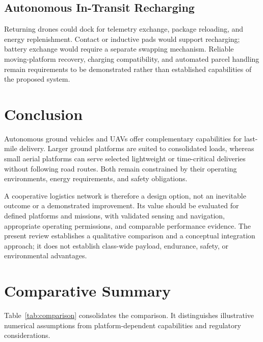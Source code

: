 \documentclass[11pt,a4paper]{article}
\begin{document}
\subsection{Autonomous In-Transit Recharging}
Returning drones could dock for telemetry exchange, package reloading, and energy replenishment. Contact or inductive pads would support recharging; battery exchange would require a separate swapping mechanism. Reliable moving-platform recovery, charging compatibility, and automated parcel handling remain requirements to be demonstrated rather than established capabilities of the proposed system.

\section{Conclusion}
Autonomous ground vehicles and UAVs offer complementary capabilities for last-mile delivery. Larger ground platforms are suited to consolidated loads, whereas small aerial platforms can serve selected lightweight or time-critical deliveries without following road routes. Both remain constrained by their operating environments, energy requirements, and safety obligations.

A cooperative logistics network is therefore a design option, not an inevitable outcome or a demonstrated improvement. Its value should be evaluated for defined platforms and missions, with validated sensing and navigation, appropriate operating permissions, and comparable performance evidence. The present review establishes a qualitative comparison and a conceptual integration approach; it does not establish class-wide payload, endurance, safety, or environmental advantages.

\newpage
\section{Comparative Summary}
Table~\ref{tab:comparison} consolidates the comparison. It distinguishes illustrative numerical assumptions from platform-dependent capabilities and regulatory considerations.
\end{document}
